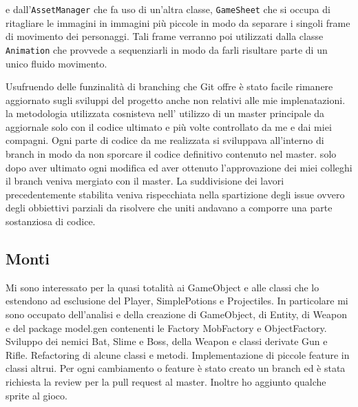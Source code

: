 \documentclass[a4paper,12pt]{report}
\begin{document}
    e dall’\texttt{AssetManager} che fa uso di un’altra classe, \texttt{GameSheet} che si occupa di ritagliare le immagini in immagini più piccole
    in modo da separare i singoli frame di movimento dei personaggi. Tali frame verranno poi utilizzati dalla classe \texttt{Animation} che
    provvede a sequenziarli in modo da farli risultare parte di un unico fluido movimento.
    \par Usufruendo delle funzinalità di branching che Git offre è stato facile rimanere aggiornato sugli sviluppi del progetto anche non
    relativi alle mie implenatazioni. la metodologia utilizzata cosnisteva nell' utilizzo di un master principale da aggiornale solo con
    il codice ultimato e più volte controllato da me e dai miei compagni. Ogni parte di codice da me realizzata si sviluppava all'interno di branch
    in modo da non sporcare il codice definitivo contenuto nel master. solo dopo aver ultimato ogni modifica ed aver ottenuto l'approvazione dei miei colleghi
    il branch veniva mergiato con il master.
    La suddivisione dei lavori precedentemente stabilita veniva rispecchiata nella spartizione degli issue ovvero degli obbiettivi parziali da risolvere che uniti
    andavano a comporre una parte sostanziosa di codice.
    \subsection{Monti}
    \par Mi sono interessato per la quasi totalità ai GameObject e alle classi che lo estendono ad esclusione del Player, SimplePotions e Projectiles.
    In particolare mi sono occupato dell'analisi e della creazione di GameObject, di Entity, di Weapon e del package model.gen contenenti le Factory MobFactory
    e ObjectFactory.
    Sviluppo dei nemici Bat, Slime e Boss, della Weapon e classi derivate Gun e Rifle.
    Refactoring di alcune classi e metodi. Implementazione di piccole feature in classi altrui.
    Per ogni cambiamento o feature è stato creato un branch ed è stata richiesta la review per la pull request al master.
    Inoltre ho aggiunto qualche sprite al gioco.
\end{document}
